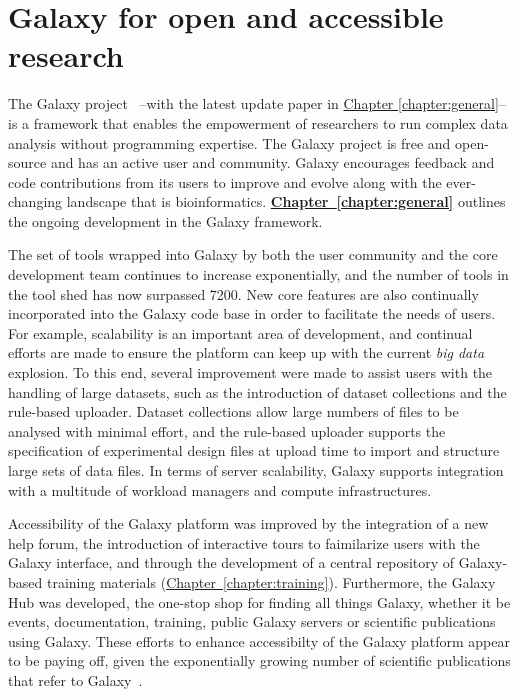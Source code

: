 \section{Galaxy for open and accessible research}
The Galaxy project~\cite{giardine2005galaxy,blankenberg2010galaxy,afgan2016galaxy} --with the latest update paper \cite{afgan2018galaxy} in \hyperref[chapter:galaxy]{Chapter \ref{chapter:general}}-- is a framework that enables the empowerment of researchers to run complex data analysis without programming expertise. The Galaxy project is free and open-source and has an active user and community. Galaxy encourages feedback and code contributions from its users to improve and evolve along with the ever-changing landscape that is bioinformatics. \hyperref[chapter:galaxy]{\textbf{Chapter~\ref{chapter:general}}} outlines the ongoing development in the Galaxy framework.

The set of tools wrapped into Galaxy by both the user community and the core development team continues to increase exponentially, and the number of tools in the tool shed has now surpassed 7200. New core features are also continually incorporated into the Galaxy code base in order to facilitate the needs of users. For example, scalability is an important area of development, and continual efforts are made to ensure the platform can keep up with the current \emph{big data} explosion. To this end, several improvement were made to assist users with the handling of large datasets, such as the introduction of dataset collections and the rule-based uploader. Dataset collections allow large numbers of files to be analysed with minimal effort, and the rule-based uploader supports the specification of experimental design files at upload time to import and structure large sets of data files. In terms of server scalability, Galaxy supports integration with a multitude of workload managers and compute infrastructures.

Accessibility of the Galaxy platform was improved by the integration of a new help forum, the introduction of interactive tours to faimilarize users with the Galaxy interface, and through the development of a central repository of Galaxy-based training materials (\hyperref[chapter:galaxy]{Chapter~\ref{chapter:training}}). Furthermore, the Galaxy Hub was developed, the one-stop shop for finding all things Galaxy, whether it be events, documentation, training, public Galaxy servers or scientific publications using Galaxy. These efforts to enhance accessibilty of the Galaxy platform appear to be paying off, given the exponentially growing number of scientific publications that refer to Galaxy~\cite{url-zotero-galaxy}.


